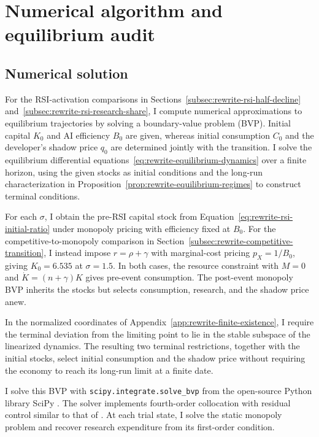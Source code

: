\section{Numerical algorithm and equilibrium audit}
\label{app:rewrite-algorithm}

\subsection{Numerical solution}

For the RSI-activation comparisons in
Sections~\ref{subsec:rewrite-rsi-half-decline} and~\ref{subsec:rewrite-rsi-research-share},
I compute numerical approximations to equilibrium trajectories by solving
a boundary-value problem (BVP). Initial capital $K_0$ and AI efficiency
$B_0$ are given, whereas initial consumption $C_0$ and the developer's
shadow price $q_0$ are determined jointly with the transition.
I solve the equilibrium differential equations~\eqref{eq:rewrite-equilibrium-dynamics} over a finite horizon,
using the given stocks as initial conditions and the long-run
characterization in Proposition~\ref{prop:rewrite-equilibrium-regimes}
to construct terminal conditions.

\label{app:rewrite-competitive-transition-numerics}
For each $\sigma$, I obtain the pre-RSI capital stock from
Equation~\eqref{eq:rewrite-rsi-initial-ratio} under monopoly pricing with
efficiency fixed at $B_0$. For the competitive-to-monopoly comparison in
Section~\ref{subsec:rewrite-competitive-transition}, I instead impose
$r=\rho+\gamma$ with marginal-cost pricing $p_X=1/B_0$, giving
$K_0=6.535$ at $\sigma=1.5$. In both cases, the resource constraint
with $M=0$ and $\dot K=(n+\gamma)K$ gives pre-event consumption.
The post-event monopoly BVP inherits the stocks but selects consumption,
research, and the shadow price anew.

In the normalized coordinates of Appendix~\ref{app:rewrite-finite-existence},
I require the terminal deviation from the limiting point to lie in the
stable subspace of the linearized dynamics. The resulting two terminal
restrictions, together with the initial stocks, select initial consumption
and the shadow price without requiring the economy to reach its long-run
limit at a finite date.

I solve this BVP with \texttt{scipy.integrate.solve\_bvp} from the
open-source Python library SciPy \citep{virtanenetal2020}. The solver
implements fourth-order collocation with residual control similar to that
of \citet{kierzenkashampine2001}. At each trial state, I solve the static
monopoly problem and recover research expenditure from its first-order
condition.

